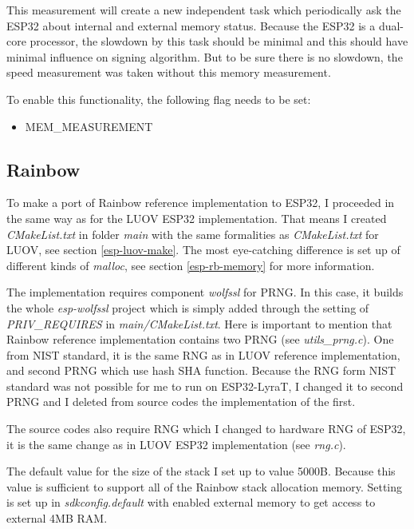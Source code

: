 \documentclass[thesis=M,english]{FITthesis}[2019/12/23]
\begin{document}
\bigskip
\noindent
This measurement will create a new independent task which periodically ask the ESP32 about internal and external memory status. Because the ESP32 is a dual-core processor, the slowdown by this task should be minimal and this should have minimal influence on signing algorithm. But to be sure there is no slowdown, the speed measurement was taken without this memory measurement.

\bigskip
\noindent
To enable this functionality, the following flag needs to be set:
\begin{itemize}
\item	MEM\_MEASUREMENT
\end{itemize}

\subsection{Rainbow}
To make a port of Rainbow reference implementation to ESP32, I proceeded in the same way as for the LUOV ESP32 implementation. That means I created \textit{CMakeList.txt} in folder \textit{main} with the same formalities as \textit{CMakeList.txt} for LUOV, see section \ref{esp-luov-make}. The most eye-catching difference is set up of different kinds of \textit{malloc}, see section \ref{esp-rb-memory} for more information.

\bigskip
\noindent
The implementation requires component \textit{wolfssl} for PRNG. In this case, it builds the whole \textit{esp-wolfssl} project which is simply added through the setting of \textit{PRIV\_REQUIRES} in \textit{main/CMakeList.txt}. Here is important to mention that Rainbow reference implementation contains two PRNG (see \textit{utils\_prng.c}). One from NIST standard, it is the same RNG as in LUOV reference implementation, and second PRNG which use hash SHA function. Because the RNG form NIST standard was not possible for me to run on ESP32-LyraT, I changed it to second PRNG and I deleted from source codes the implementation of the first.

\bigskip
\noindent
The source codes also require RNG which I changed to hardware RNG of ESP32, it is the same change as in LUOV ESP32 implementation (see \textit{rng.c}).

\bigskip
\noindent
The default value for the size of the stack I set up to value 5000B. Because this value is sufficient to support all of the Rainbow stack allocation memory. Setting is set up in \textit{sdkconfig.default} with enabled external memory to get access to external 4MB RAM.
\end{document}
